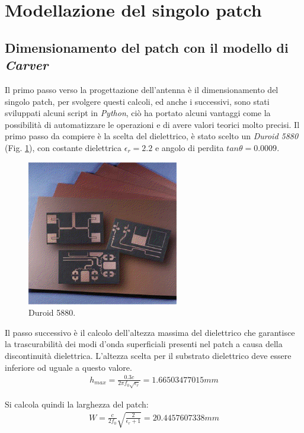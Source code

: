 \section{Modellazione del singolo patch}

\subsection{Dimensionamento del patch con il modello di \emph{Carver}}
Il primo passo verso la progettazione dell'antenna è il dimensionamento del singolo patch, per svolgere questi calcoli, ed anche i successivi, sono stati sviluppati alcuni script in \emph{Python}, ciò ha portato alcuni vantaggi come la possibilità di automatizzare le operazioni e di avere valori teorici molto precisi.
Il primo passo da compiere è la scelta del dielettrico, è stato scelto un \emph{Duroid 5880} (Fig. \ref{img:duroid}), con costante dielettrica $\epsilon_r = 2.2$ e angolo di perdita  $tan \theta = 0.0009$.
\begin{figure}
\centering
\caption{Duroid 5880.}
\label{img:duroid}
\includegraphics[scale=0.3]{Immagini/duroid}
\end{figure}

Il passo successivo è il calcolo dell'altezza massima del dielettrico che garantisce la
trascurabilità dei modi d'onda superficiali presenti nel patch a causa della discontinuità dielettrica. L'altezza scelta per il substrato dielettrico deve essere inferiore od uguale a questo valore.
\begin{align}
\label{eq:hmax}
h_{max} = \frac{0.3 c}{2 \pi f_{0} \sqrt{\epsilon_{r}}} = 1.66503477015 mm
\end{align}

Si calcola quindi la larghezza del patch:
\begin{align}
\label{eq:w}
W = \frac{c}{2f_0}\sqrt{\frac{2}{\epsilon_r+1}} = 20.4457607338 mm 
\end{align} 

